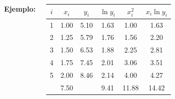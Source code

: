\documentclass[9pt, aspectratio=169]{beamer}
\begin{document}
\begin{frame}
	\begin{columns}
		\cx
		\textbf{Ejemplo:}

		\begin{center}
			\begin{tabular}{cccccc}
				\toprule
				$i$ & $x_i$ & $y_i$ & $\ln y_i$ & $x_i^2$ & $x_i \ln y_i$ \\
				\midrule
				1   & 1.00  & 5.10  & 1.63      & 1.00    & 1.63          \\
				2   & 1.25  & 5.79  & 1.76      & 1.56    & 2.20          \\
				3   & 1.50  & 6.53  & 1.88      & 2.25    & 2.81          \\
				4   & 1.75  & 7.45  & 2.01      & 3.06    & 3.51          \\
				5   & 2.00  & 8.46  & 2.14      & 4.00    & 4.27          \\
				\midrule
				    & 7.50  &       & 9.41      & 11.88   & 14.42         \\
				\bottomrule
			\end{tabular}
		\end{center}


\end{columns}
\end{frame}
\end{document}
